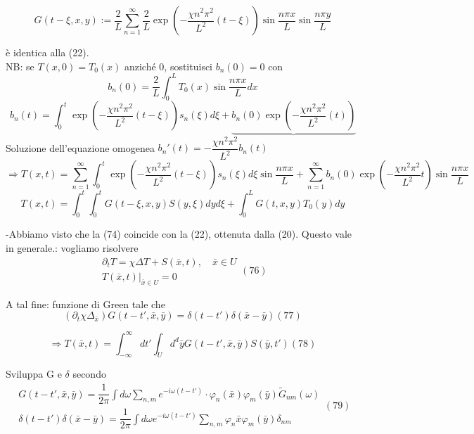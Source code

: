 \documentclass[a4paper,11pt]{report}
\newcommand{\x}{\bar{x}}
\newcommand{\y}{\bar{y}}
\begin{document}
\begin{equation}
G(t-\xi,x,y):=\dfrac{2}{L}\sum_{n=1}^{\infty}\dfrac{2}{L}\exp \left(-\dfrac{\chi n^2 \pi^2}{L^2}(t-\xi)\right) \sin \dfrac{n\pi x}{L}\sin \dfrac{n\pi y}{L}
\end{equation}

è identica alla (22).\\%
NB: se $T(x,0)=T_0(x)$ anziché 0, sostituisci $ b_n(0)=0$ con
$$
b_n(0)=\dfrac{2}{L}\int_0^L T_0(x)\sin\dfrac{n\pi x}{L}dx
$$
$$
b_n(t)=\int_0^t\exp\left(-\dfrac{\chi n^2 \pi^2}{L^2}(t-\xi)\right)s_n(\xi)d\xi + \underbrace{b_n(0)\exp\left(-\dfrac{\chi n^2 \pi^2}{L^2}(t)\right)}
$$
Soluzione dell'equazione omogenea $b_n'(t)=-\dfrac{\chi n^2 \pi^2}{L^2}b_n(t)$
$$
\Rightarrow T(x,t) = \sum_{n=1}^\infty \int_0^t\exp\left(-\dfrac{\chi n^2 \pi^2}{L^2}(t-\xi)\right)s_n(\xi)d\xi\sin\dfrac{n\pi x}{L}+\sum_{n=1}^\infty b_n(0)\exp\left(-\dfrac{\chi n^2 \pi^2}{L^2}t\right)\sin\dfrac{n\pi x}{L}
$$
\begin{equation}
T(x,t)=\int_0^t \int_0^t G(t-\xi,x,y)S(y,\xi)dyd\xi + \int_0^L G(t,x,y)T_0(y)dy
\end{equation}

-Abbiamo visto che la (74) coincide con la (22), ottenuta dalla (20). Questo vale in generale.: vogliamo risolvere
\begin{equation}
\begin{matrix}
\partial_t T=\chi\Delta T + S(\x,t), \quad \x \in U\\
T(\x,t)|_{\x\in U}=0
\end{matrix} (76)
\end{equation}

A tal fine: funzione di Green tale che 
\begin{equation}
(\partial_t \chi \Delta_{\x})G(t-t',\x,\y)=\delta(t-t')\delta(\x-\y) (77)
\end{equation}

\begin{equation}
\Rightarrow T(\x,t)=\int_{-\infty}^{\infty}dt'\int_{U}d^d\y G(t-t',\x,\y)S(\y,t') (78)
\end{equation}

Sviluppa G e $\delta$ secondo
\begin{equation}
\begin{matrix}
G(t-t',\x,\y)=\dfrac{1}{2\pi}\int d\omega\sum_{n,m}e^{-i\omega(t-t')}\cdot \varphi_n (\x)\varphi_m(\y)\tilde{G}_{n m}(\omega)\\
\delta(t-t')\delta(\x-\y)=\dfrac{1}{2\pi}\int d\omega e^{-i\omega(t-t')}\sum_{n,m}\varphi_n{\x}\varphi_m(\y)\delta_{nm}\end{matrix} (79)
\end{equation}
\end{document}
